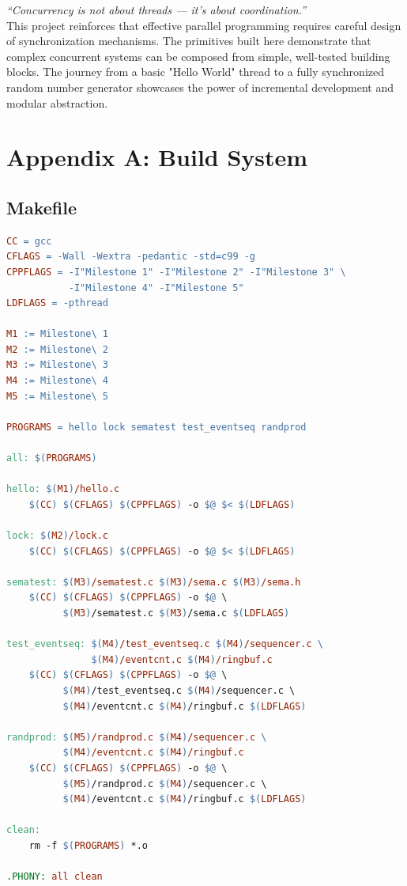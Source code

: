 \documentclass[12pt,a4paper]{article}
\begin{document}
\vspace{1cm}

\begin{tcolorbox}[colback=blue!5!white,colframe=blue!75!black,title=Final Remarks]
\textit{``Concurrency is not about threads — it's about coordination.''} \\[0.3cm]
This project reinforces that effective parallel programming requires careful design of synchronization mechanisms. The primitives built here demonstrate that complex concurrent systems can be composed from simple, well-tested building blocks. The journey from a basic "Hello World" thread to a fully synchronized random number generator showcases the power of incremental development and modular abstraction.
\end{tcolorbox}

\clearpage

\section*{Appendix A: Build System}

\subsection*{Makefile}
\begin{lstlisting}[language=make, caption={Complete Makefile}]
CC = gcc
CFLAGS = -Wall -Wextra -pedantic -std=c99 -g
CPPFLAGS = -I"Milestone 1" -I"Milestone 2" -I"Milestone 3" \
           -I"Milestone 4" -I"Milestone 5"
LDFLAGS = -pthread

M1 := Milestone\ 1
M2 := Milestone\ 2
M3 := Milestone\ 3
M4 := Milestone\ 4
M5 := Milestone\ 5

PROGRAMS = hello lock sematest test_eventseq randprod

all: $(PROGRAMS)

hello: $(M1)/hello.c
	$(CC) $(CFLAGS) $(CPPFLAGS) -o $@ $< $(LDFLAGS)

lock: $(M2)/lock.c
	$(CC) $(CFLAGS) $(CPPFLAGS) -o $@ $< $(LDFLAGS)

sematest: $(M3)/sematest.c $(M3)/sema.c $(M3)/sema.h
	$(CC) $(CFLAGS) $(CPPFLAGS) -o $@ \
	      $(M3)/sematest.c $(M3)/sema.c $(LDFLAGS)

test_eventseq: $(M4)/test_eventseq.c $(M4)/sequencer.c \
               $(M4)/eventcnt.c $(M4)/ringbuf.c
	$(CC) $(CFLAGS) $(CPPFLAGS) -o $@ \
	      $(M4)/test_eventseq.c $(M4)/sequencer.c \
	      $(M4)/eventcnt.c $(M4)/ringbuf.c $(LDFLAGS)

randprod: $(M5)/randprod.c $(M4)/sequencer.c \
          $(M4)/eventcnt.c $(M4)/ringbuf.c
	$(CC) $(CFLAGS) $(CPPFLAGS) -o $@ \
	      $(M5)/randprod.c $(M4)/sequencer.c \
	      $(M4)/eventcnt.c $(M4)/ringbuf.c $(LDFLAGS)

clean:
	rm -f $(PROGRAMS) *.o

.PHONY: all clean
\end{lstlisting}
\end{document}
